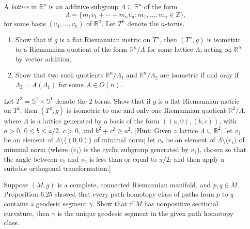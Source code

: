\begin{exercise}
\label{prob:lattices-flat-tori}
A \emph{lattice} in $\mathbb{R}^n$ is an additive subgroup $\Lambda \subseteq \mathbb{R}^n$ of the form
\[
\Lambda = \{m_1 v_1 + \cdots + m_n v_n : m_1, \ldots, m_n \in \mathbb{Z}\},
\]
for some basis $(v_1, \ldots, v_n)$ of $\mathbb{R}^n$. Let $T^n$ denote the $n$-torus.
\begin{enumerate}
\item[(a)] Show that if $g$ is a flat Riemannian metric on $T^n$, then $(T^n, g)$ is isometric to a Riemannian quotient of the form $\mathbb{R}^n/\Lambda$ for some lattice $\Lambda$, acting on $\mathbb{R}^n$ by vector addition.
\item[(b)] Show that two such quotients $\mathbb{R}^n/\Lambda_1$ and $\mathbb{R}^n/\Lambda_2$ are isometric if and only if $\Lambda_2 = A(\Lambda_1)$ for some $A \in O(n)$.
\end{enumerate}
\end{exercise}

\begin{exercise}
\label{prob:classification-flat-tori}
Let $T^2 = \mathbb{S}^1 \times \mathbb{S}^1$ denote the 2-torus. Show that if $g$ is a flat Riemannian metric on $T^2$, then $(T^2, g)$ is isometric to one and only one Riemannian quotient $\mathbb{R}^2/\Lambda$, where $\Lambda$ is a lattice generated by a basis of the form $((a,0), (b,c))$, with $a > 0$, $0 \leq b \leq a/2$, $c > 0$, and $b^2 + c^2 \geq a^2$. [Hint: Given a lattice $\Lambda \subseteq \mathbb{R}^2$, let $v_1$ be an element of $\Lambda \setminus \{(0,0)\}$ of minimal norm; let $v_2$ be an element of $\Lambda \setminus \langle v_1 \rangle$ of minimal norm (where $\langle v_1 \rangle$ is the cyclic subgroup generated by $v_1$), chosen so that the angle between $v_1$ and $v_2$ is less than or equal to $\pi/2$; and then apply a suitable orthogonal transformation.]
\end{exercise}

\begin{exercise}
\label{prob:geodesic-uniqueness-nonpositive-curvature}
Suppose $(M,g)$ is a complete, connected Riemannian manifold, and $p,q \in M$. Proposition 6.25 showed that every path-homotopy class of paths from $p$ to $q$ contains a geodesic segment $\gamma$. Show that if $M$ has nonpositive sectional curvature, then $\gamma$ is the unique geodesic segment in the given path homotopy class.
\end{exercise}


